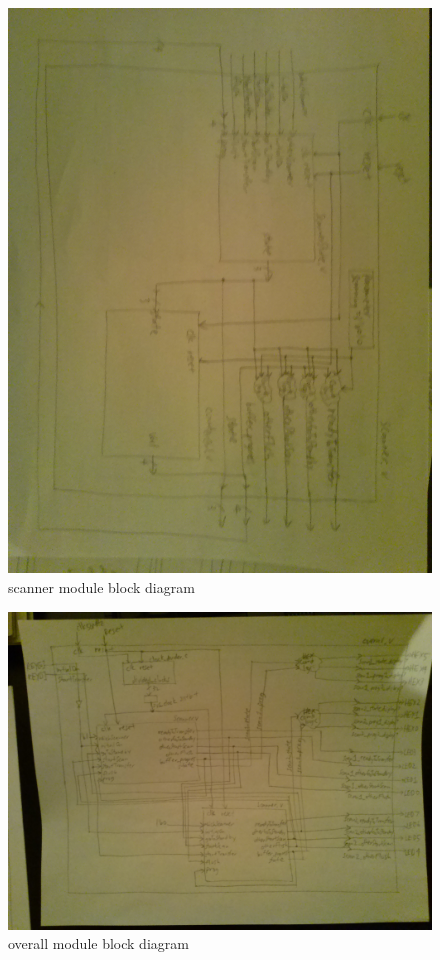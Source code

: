 \documentclass{article}
\begin{document}
      \begin{figure}[H]
        \centering
        \includegraphics[width=0.75\linewidth]{figures/block_diagrams/scanner.jpg}
        \caption{scanner module block diagram}
        \label{fig:scanner_blockdiagram}
      \end{figure}

      \begin{figure}[H]
        \centering
        \includegraphics[width=0.75\linewidth]{figures/block_diagrams/lab4_overall_blockdiagram.jpg}
        \caption{overall module block diagram}
        \label{fig:lab4_overall_blockdiagram}
      \end{figure}
\end{document}

